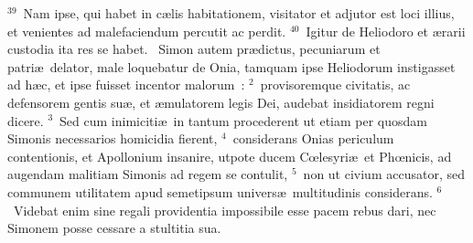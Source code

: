 ${}^{39}$~Nam ipse, qui habet in c\ae lis habitationem, visitator et adjutor est loci illius, et venientes ad malefaciendum percutit ac perdit.
${}^{40}$~Igitur de Heliodoro et \ae rarii custodia ita res se habet.
~\lettrine[lines=10,image=true,loversize=0.05,lraise=-0.03]{S}{}imon autem pr\ae dictus, pecuniarum et patri\ae\ delator, male loquebatur de Onia, tamquam ipse Heliodorum instigasset ad h\ae c, et ipse fuisset incentor malorum~:
${}^{2}$~provisoremque civitatis, ac defensorem gentis su\ae , et \ae mulatorem legis Dei, audebat insidiatorem regni dicere.
${}^{3}$~Sed cum inimiciti\ae\ in tantum procederent ut etiam per quosdam Simonis necessarios homicidia fierent,
${}^{4}$~considerans Onias periculum contentionis, et Apollonium insanire, utpote ducem Cœlesyri\ae\ et Phœnicis, ad augendam malitiam Simonis ad regem se contulit,
${}^{5}$~non ut civium accusator, sed communem utilitatem apud semetipsum univers\ae\ multitudinis considerans.
${}^{6}$~Videbat enim sine regali providentia impossibile esse pacem rebus dari, nec Simonem posse cessare a stultitia sua.


